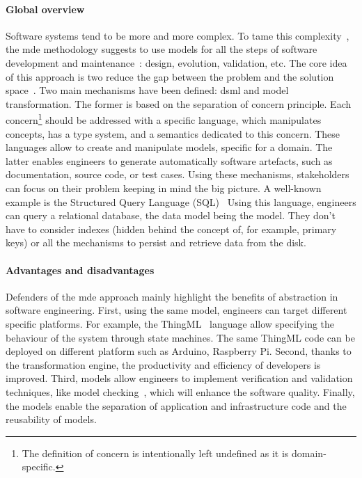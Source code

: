 \paragraph{Global overview}    
Software systems tend to be more and more complex.
To tame this complexity~\cite{DBLP:conf/icse/FranceR07, DBLP:journals/computer/Schmidt06}, the \gls{mde} methodology suggests  to use \glspl{model} for all the steps of software development and maintenance~\cite{DBLP:journals/computer/Schmidt06, DBLP:series/synthesis/2017Brambilla, DBLP:conf/icse/HutchinsonRW11, DBLP:conf/uml/BakerLW05, DBLP:conf/icse/HutchinsonWRK11, DBLP:journals/software/AtkinsonK03a}: design, evolution, validation, etc.
The core idea of this approach is two reduce the gap between the problem and the solution space~\cite{DBLP:journals/computer/Schmidt06}.
Two main mechanisms have been defined: \gls{dsml} and model transformation.
The former is based on the separation of concern principle.
Each concern\footnote{The definition of concern is intentionally left undefined as it is domain-specific.} should be addressed with a specific language, which manipulates concepts, has a type system, and a semantics dedicated to this concern.
These languages allow to create and manipulate \glspl{model}, specific for a domain.
The latter enables engineers to generate automatically software artefacts, such as documentation, source code, or test cases.
Using these mechanisms, stakeholders can focus on their problem keeping in mind the big picture.
A well-known example is the Structured Query Language \linebreak (SQL)~\cite{SQL:Spec}
Using this language, engineers can query a relational database, the data model being the \gls{model}.
They don't have to consider indexes (hidden behind the concept of, for example, primary keys) or all the mechanisms to persist and retrieve data from the disk.

\paragraph{Advantages and disadvantages}
Defenders of the \gls{mde} approach mainly highlight the benefits of abstraction in software engineering\cite{DBLP:journals/computer/Schmidt06, DBLP:conf/ifm/Kent02, DBLP:conf/uml/BakerLW05}.
First, using the same \gls{model}, engineers can target different specific platforms.
For example, the ThingML~\cite{DBLP:conf/models/HarrandFMH16} language allow specifying the behaviour of the system through state machines.
The same ThingML code can be deployed on different platform such as Arduino, Raspberry Pi.
Second, thanks to the transformation engine, the productivity and efficiency of developers is improved.
Third, \glspl{model} allow engineers to implement verification and validation techniques, like model checking~\cite{DBLP:books/daglib/0020348}, which will enhance the software quality.
Finally, the \glspl{model} enable the separation of application and infrastructure code and the reusability of \glspl{model}.

